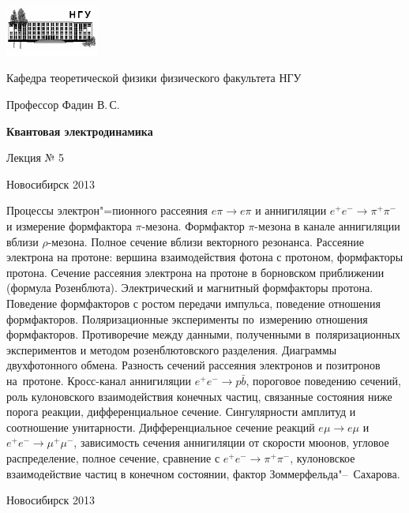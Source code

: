 \documentclass[12pt,pagesize,paper=192mm:108mm]{scrbook}
\begin{document}
\begin{titlepage}
  \vspace*{-1em}
  \begin{center}
    \includegraphics[width=0.23\textwidth]{../NSU-logo}

    Кафедра теоретической физики физического факультета НГУ
    \medskip

    \Large
    Профессор Фадин В.\,С.
    \bigskip

    \huge
    \textbf{Квантовая электродинамика}
    \bigskip

    \Large
    Лекция № 5
    \vfill

    \normalsize
    \vfill

    \normalsize \ccbysa\hspace{0.5em}  Новосибирск 2013
  \end{center}
\end{titlepage}
\vspace*{-1em}
\begin{center}
\vfill
  \begin{minipage}{0.85\linewidth}
    Процессы электрон"=пионного рассеяния $e \pi \to e \pi$ и
    аннигиляции $e^+e^-\to\pi^+\pi^-$ и измерение формфактора
    $\pi$-мезона. Формфактор $\pi$-мезона в канале аннигиляции вблизи
    $\rho$-мезона. Полное сечение вблизи векторного резонанса.
    Рассеяние электрона на протоне: вершина взаимодействия фотона с
    протоном, формфакторы протона. Сечение рассеяния электрона на
    протоне в борновском приближении (формула
    Розенблюта). Электрический и магнитный формфакторы
    протона. Поведение формфакторов с ростом передачи импульса,
    поведение отношения формфакторов. Поляризационные эксперименты
    по~измерению отношения формфакторов. Противоречие между данными,
    полученными в~поляризационных экспериментов и методом
    розенблютовского разделения.  Диаграммы двухфотонного
    обмена. Разность сечений рассеяния электронов и позитронов
    на~протоне. Кросс-канал аннигиляции $e^+e^- \to p\bar{b}$,
    пороговое поведению сечений, роль кулоновского взаимодействия
    конечных частиц, связанные состояния ниже порога реакции,
    дифференциальное сечение. Сингулярности амплитуд и соотношение
    унитарности.  Дифференциальное сечение реакций $e\mu \to e\mu$ и
    $e^+e^- \to \mu^+\mu^-$, зависимость сечения аннигиляции от
    скорости мюонов, угловое распределение, полное сечение, сравнение
    с $e^+e^- \to \pi^+\pi^-$, кулоновское взаимодействие частиц в
    конечном состоянии, фактор Зоммерфельда"--~Сахарова.
  \end{minipage}
  \vfill

  \normalsize \ccbysa\hspace{0.5em} Новосибирск 2013
\end{center}
\end{document}

